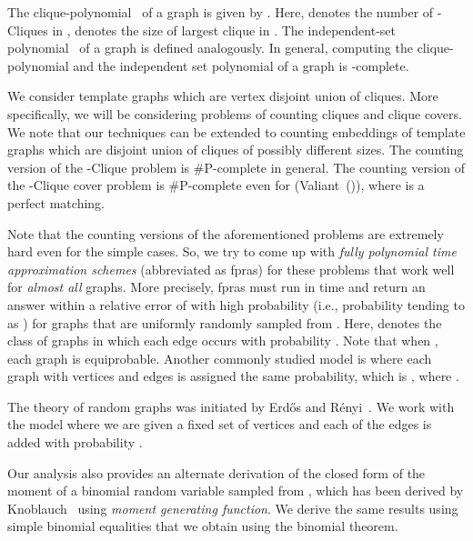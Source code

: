 \documentclass[runningheads,a4paper]{llncs}
\begin{document}
The clique-polynomial~\cite{HL94} of a graph  is given by . Here,  denotes the number of -Cliques in ,  denotes the size of largest clique in . The independent-set polynomial~\cite{HL94} of a graph is defined analogously. 
In general, computing the clique-polynomial and the independent set polynomial of a graph  is -complete. 

We consider template graphs which are vertex disjoint union of cliques. More specifically, we will be considering problems of counting cliques and clique covers. We note that our techniques can be extended to counting embeddings of template graphs which are disjoint union of cliques of possibly different sizes.
The counting version of the -Clique problem is \#P-complete in general.  The counting version of the -Clique cover problem is \#P-complete even for  (Valiant~(\cite{V79})), where  is a perfect matching. 

Note that the counting versions of the aforementioned problems are extremely hard even for the simple cases. So, we try to come up with {\em fully polynomial time approximation schemes} (abbreviated as fpras) for these problems that work well for {\em almost all} graphs. More precisely, 
fpras must run in time  and return an answer within a relative error of  with high probability (i.e., probability tending to  as ) for graphs that are uniformly randomly sampled from . Here,    denotes the class of 
graphs in which each edge occurs with probability . Note that when , each graph  is equiprobable. Another commonly studied model is  where each graph with  vertices 
and  edges is assigned the same probability, which is , where . 

The theory of random graphs was initiated by Erd\H{o}s and R\'{e}nyi~\cite{ER60}. We work with the model  where we are given a fixed set of  vertices and each of the  edges is added with probability . 

Our analysis also provides an alternate derivation of the closed form of the  moment of a binomial random variable  sampled from , which has been derived by Knoblauch~\cite{K08a} using {\em moment generating function}. We derive the same results using simple binomial equalities that we obtain using the binomial theorem.
\end{document}
